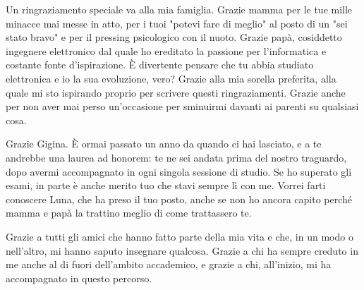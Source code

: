 \documentclass[12pt,a4paper]{report}
\begin{document}
\setlength{\parskip}{1em}

Un ringraziamento speciale va alla mia famiglia. Grazie mamma per le
tue mille minacce mai messe in atto, per i tuoi "potevi fare di
meglio" al posto di un "sei stato bravo" e per il pressing
psicologico con il nuoto. Grazie papà, cosiddetto ingegnere
elettronico dal quale ho ereditato la passione per l'informatica e
costante fonte d'ispirazione. È divertente pensare che tu abbia
studiato elettronica e io la sua evoluzione, vero? Grazie alla mia
sorella preferita, alla quale mi sto ispirando proprio per scrivere
questi ringraziamenti. Grazie anche per non aver mai perso
un'occasione per sminuirmi davanti ai parenti su qualsiasi cosa.

\setlength{\parskip}{1em}

Grazie Gigina. È ormai passato un anno da quando ci hai lasciato, e a
te andrebbe una laurea ad honorem: te ne sei andata prima del nostro
traguardo, dopo avermi accompagnato in ogni singola sessione di
studio. Se ho superato gli esami, in parte è anche merito tuo che
stavi sempre lì con me. Vorrei farti conoscere Luna, che ha preso il
tuo posto, anche se non ho ancora capito perché mamma e papà la
trattino meglio di come trattassero te.

\setlength{\parskip}{1em}

Grazie a tutti gli amici che hanno fatto parte della mia vita e che,
in un modo o nell'altro, mi hanno saputo insegnare qualcosa. Grazie a
chi ha sempre creduto in me anche al di fuori dell'ambito accademico,
e grazie a chi, all'inizio, mi ha accompagnato in questo percorso.
\end{document}

